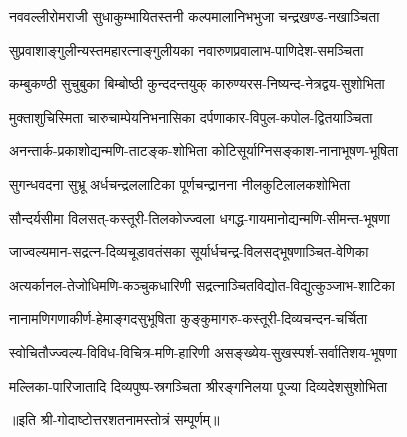 \twolineshloka
{नववल्लीरोमराजी  सुधाकुम्भायितस्तनी}
{कल्पमालानिभभुजा  चन्द्रखण्ड-नखाञ्चिता}%

\twolineshloka
{सुप्रवाशाङ्गुलीन्यस्तमहारत्नाङ्गुलीयका}
{नवारुणप्रवालाभ-पाणिदेश-समञ्चिता}%

\twolineshloka
{कम्बुकण्ठी  सुचुबुका  बिम्बोष्ठी  कुन्ददन्तयुक्}
{कारुण्यरस-निष्यन्द-नेत्रद्वय-सुशोभिता}%


\twolineshloka
{मुक्ताशुचिस्मिता  चारुचाम्पेयनिभनासिका}
{दर्पणाकार-विपुल-कपोल-द्वितयाञ्चिता}%


\twolineshloka
{अनन्तार्क-प्रकाशोद्यन्मणि-ताटङ्क-शोभिता}
{कोटिसूर्याग्निसङ्काश-नानाभूषण-भूषिता}%


\twolineshloka
{सुगन्धवदना  सुभ्रू  अर्धचन्द्रललाटिका}
{पूर्णचन्द्रानना  नीलकुटिलालकशोभिता}%


\twolineshloka
{सौन्दर्यसीमा  विलसत्-कस्तूरी-तिलकोज्ज्वला}
{धगद्ध-गायमानोद्यन्मणि-सीमन्त-भूषणा}%


\twolineshloka
{जाज्वल्यमान-सद्रत्न-दिव्यचूडावतंसका}
{सूर्यार्धचन्द्र-विलसद्भूषणाञ्चित-वेणिका}%


\twolineshloka
{अत्यर्कानल-तेजोधिमणि-कञ्चुकधारिणी}
{सद्रत्नाञ्चितविद्योत-विद्युत्कुञ्जाभ-शाटिका}%

\twolineshloka
{नानामणिगणाकीर्ण-हेमाङ्गदसुभूषिता}
{कुङ्कुमागरु-कस्तूरी-दिव्यचन्दन-चर्चिता}%

\twolineshloka
{स्वोचितौज्ज्वल्य-विविध-विचित्र-मणि-हारिणी}
{असङ्ख्येय-सुखस्पर्श-सर्वातिशय-भूषणा}%

\twolineshloka
{मल्लिका-पारिजातादि  दिव्यपुष्प-स्रगञ्चिता}
{श्रीरङ्गनिलया  पूज्या  दिव्यदेशसुशोभिता}%

{॥इति श्री-गोदाष्टोत्तरशतनामस्तोत्रं सम्पूर्णम्॥}